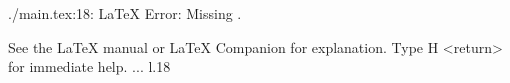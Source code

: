 \relax 
./main.tex:18: LaTeX Error: Missing .

See the LaTeX manual or LaTeX Companion for explanation.
Type  H <return>  for immediate help. ...                                                                                                l.18                    \providecommand\hyper@newdestlabel[2]{}
\providecommand*\new@tpo@label[2]{}
